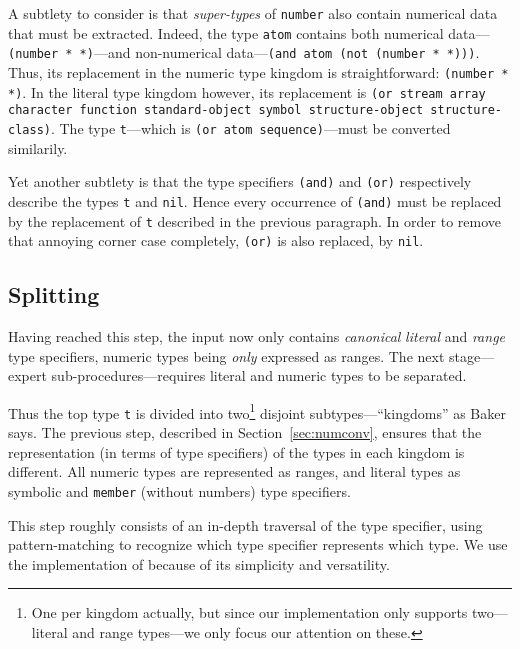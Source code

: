 \documentclass[format=sigconf]{acmart}
\newcommand\code[2][\small]{\sloppy\texttt{#1#2}}
\theoremstyle{definition}
\begin{document}
A subtlety to consider is that \textit{super-types} of \code{number} also
contain numerical data that must be extracted. Indeed, the type
\code{atom} contains both numerical data---\code{(number * *)}---and non-numerical
data---\code{(and atom (not (number * *)))}.
Thus, its replacement in the numeric type kingdom is straightforward:
\code{(number * *)}. In the literal type kingdom however, its replacement is
\code{(or stream array character function standard-object symbol
  structure-object structure-class)}.
The type \code{t}---which is \code{(or atom sequence)}---must be
converted similarily.

Yet another subtlety is that the type specifiers \code{(and)} and
\code{(or)} respectively describe the types \code{t} and \code{nil}. Hence
every occurrence of \code{(and)} must be replaced by the replacement of
\code{t} described in the previous paragraph. In order to remove that annoying
corner case completely, \code{(or)} is also replaced, by \code{nil}.

\subsection{Splitting}
Having reached this step, the input now only contains \emph{canonical}
\emph{literal} and \emph{range} type specifiers, numeric types being \emph{only}
expressed as ranges. The next stage---expert sub-procedures---requires literal
and numeric types to be separated.

Thus the top type \code{t} is divided into two\footnote{
  One per kingdom actually, but since our implementation only supports
  two---literal and range types---we only focus our attention on these.
} disjoint subtypes---``kingdoms'' as Baker says. The previous step, described in
Section~\ref{sec:numconv}, ensures that the representation (in terms of type
specifiers) of the types in each kingdom is different. All numeric types are
represented as ranges, and literal types as symbolic and \code{member} (without
numbers) type specifiers.

This step roughly consists of an in-depth traversal of the type specifier, using
pattern-matching to recognize which type specifier represents which type. We use
the implementation of \cite{bib:norvig.92.paip} because of its simplicity and
versatility.
\end{document}
